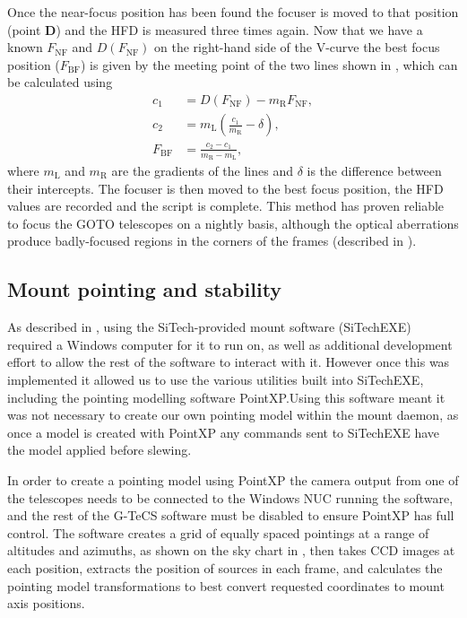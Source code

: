 \begin{colsection}
\begin{colsection}
Once the near-focus position has been found the focuser is moved to that position (point \textbf{D}) and the HFD is measured three times again. Now that we have a known $F_\text{NF}$ and $D(F_\text{NF})$ on the right-hand side of the V-curve the best focus position ($F_\text{BF}$) is given by the meeting point of the two lines shown in , which can be calculated using
%
\begin{equation}
    \begin{split}
                c_1 & = D(F_\text{NF}) - m_\text{R} F_\text{NF}, \\
                c_2 & = m_\text{L}(\frac{c_1}{m_\text{R}} - \delta), \\
        F_\text{BF} & = \frac{c_2 - c_1}{m_\text{R} - m_\text{L}},
    \end{split}
    \label{eq:bestfocus}
\end{equation}
%
where $m_\text{L}$ and $m_\text{R}$ are the gradients of the lines and $\delta$ is the difference between their intercepts. The focuser is then moved to the best focus position, the HFD values are recorded and the script is complete. This method has proven reliable to focus the GOTO telescopes on a nightly basis, although the optical aberrations produce badly-focused regions in the corners of the frames (described in ).

\end{colsection}


\subsection{Mount pointing and stability}
\label{sec:pointxp}
\begin{colsection}

As described in , using the SiTech-provided mount software (SiTechEXE) required a Windows computer for it to run on, as well as additional development effort to allow the rest of the software to interact with it. However once this was implemented it allowed us to use the various utilities built into SiTechEXE, including the pointing modelling software PointXP.\@ Using this software meant it was not necessary to create our own pointing model within the mount daemon, as once a model is created with PointXP any commands sent to SiTechEXE have the model applied before slewing.

In order to create a pointing model using PointXP the camera output from one of the telescopes needs to be connected to the Windows NUC running the software, and the rest of the G-TeCS software must be disabled to ensure PointXP has full control. The software creates a grid of equally spaced pointings at a range of altitudes and azimuths, as shown on the sky chart in , then takes CCD images at each position, extracts the position of sources in each frame, and calculates the pointing model transformations to best convert requested coordinates to mount axis positions.


\end{colsection}
\end{colsection}
